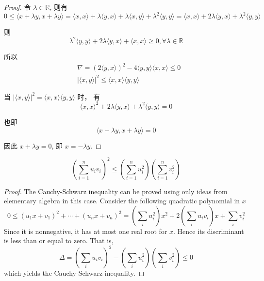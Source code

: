 \begin{proof}
    令 $\lambda \in \mathbb{R}$, 则有 
    \begin{equation}0 \leq\langle x+\lambda y, x+\lambda y\rangle=\langle x, x\rangle+\lambda\langle y, x\rangle+\lambda\langle x, y\rangle+\lambda^{2}\langle y, y\rangle=\langle x, x\rangle+2 \lambda\langle y, x\rangle+\lambda^{2}\langle y, y\rangle\end{equation}

则 
\begin{equation}\lambda^{2}\langle y, y\rangle+2 \lambda\langle y, x\rangle+\langle x, x\rangle \geq 0, \forall \lambda \in \mathbb{R}\end{equation}

所以
\begin{equation}
\begin{aligned}
&\nabla=(2\langle y, x\rangle)^{2}-4\langle y, y\rangle\langle x, x\rangle \leq 0 \\
&|\langle x, y\rangle|^{2} \leq\langle x, x\rangle\langle y, y\rangle
\end{aligned}
\end{equation}

当 $|\langle x, y\rangle|^{2}=\langle x, x\rangle\langle y, y\rangle$ 时， 有 \begin{equation}\langle x, x\rangle^{2}+2 \lambda\langle y, x\rangle+\lambda^{2}\langle y, y\rangle=0\end{equation}

也即 \begin{equation}\langle x+\lambda y, x+\lambda y\rangle=0\end{equation}

因此 $x+\lambda y=0$, 即 $x=-\lambda y$.
\end{proof}

\begin{theorem}

    \begin{equation}\left(\sum_{i=1}^{n} u_{i} v_{i}\right)^{2} \leq\left(\sum_{i=1}^{n} u_{i}^{2}\right)\left(\sum_{i=1}^{n} v_{i}^{2}\right)\end{equation}
\end{theorem}

\begin{proof}
    The Cauchy-Schwarz inequality can be proved using only ideas from elementary algebra in this case. Consider the following quadratic polynomial in $x$
\begin{equation}
0 \leq\left(u_{1} x+v_{1}\right)^{2}+\cdots+\left(u_{n} x+v_{n}\right)^{2}=\left(\sum_{i} u_{i}^{2}\right) x^{2}+2\left(\sum_{i} u_{i} v_{i}\right) x+\sum_{i} v_{i}^{2}
\end{equation}
Since it is nonnegative, it has at most one real root for $x$. Hence its discriminant is less than or equal to zero. That is,
\begin{equation}
\Delta = \left(\sum_{i} u_{i} v_{i}\right)^{2}-\left(\sum_{i} u_{i}^{2}\right)\left(\sum_{i} v_{i}^{2}\right) \leq 0
\end{equation}
which yields the Cauchy-Schwarz inequality.
\end{proof}

